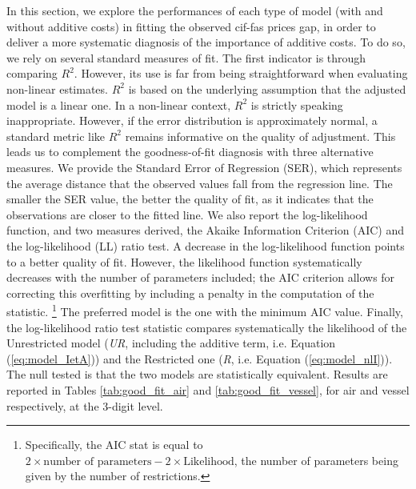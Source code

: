 \documentclass[a4paper,11pt]{article}
\begin{document}
In this section, we explore the performances of each type of model (with and without additive costs) in fitting the observed cif-fas prices gap, in order to deliver a more systematic diagnosis of the importance of additive costs.
To do so, we rely on several standard measures of fit.
The first indicator is through comparing $R^{2}$.
However, its use is far from being straightforward when evaluating non-linear estimates.
$R^2$ is based on the underlying assumption that the adjusted model is a linear one.
In a non-linear context, $R^2$ is strictly speaking inappropriate.
However, if the error distribution is approximately normal, a standard metric like $R^2$ remains informative on the quality of adjustment.
This leads us to complement the goodness-of-fit diagnosis with three alternative measures.
We provide the Standard Error of Regression (SER), which represents the average distance that the observed values fall from the regression line.
The smaller the SER value, the better the quality of fit, as it indicates that the observations are closer to the fitted line.
We also report the log-likelihood function, and two measures derived, the Akaike Information Criterion (AIC) and the log-likelihood (LL) ratio test.
A decrease in the log-likelihood function points to a better quality of fit.
However, the likelihood function systematically decreases with the number of parameters included; the AIC criterion allows for correcting this overfitting by including a penalty in the computation of the statistic. \footnote{Specifically, the AIC stat is equal to $2 \times \textrm{number of parameters} - 2 \times \textrm{Likelihood} $, the number of parameters being given by the number of restrictions.}
The preferred model is the one with the minimum AIC value.
Finally, the log-likelihood ratio test statistic compares systematically the likelihood of the Unrestricted model (\emph{UR}, including the additive term, i.e.
Equation (\ref{eq:model_IetA})) and the Restricted one (\emph{R}, i.e.
Equation (\ref{eq:model_nlI})).
The null tested is that the two models are statistically equivalent.
Results are reported in Tables \ref{tab:good_fit_air} and \ref{tab:good_fit_vessel}, for air and vessel respectively, at the 3-digit level.
\end{document}
